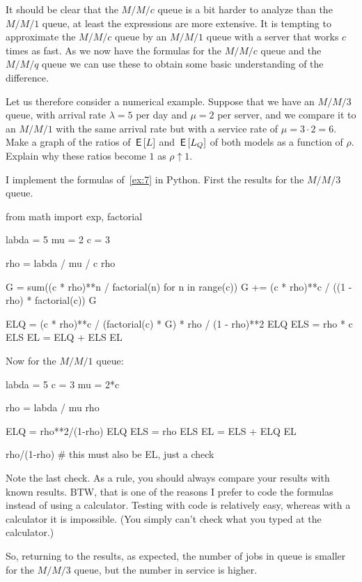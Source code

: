 \begin{exercise}\label{ex:27}
  It should be clear that the $M/M/c$ queue is a bit harder to analyze than the $M/M/1$ queue, at least the expressions are more extensive.
  It is tempting to approximate the $M/M/c$ queue by an $M/M/1$ queue with a server that works $c$ times as fast.
  As we now have the formulas for the $M/M/c$ queue and the $M/M/q$ queue we can use these to obtain some basic understanding of the difference.
  
  Let us therefore consider a numerical example.
  Suppose that we have an $M/M/3$ queue, with arrival rate $\lambda = 5$ per day and $\mu=2$ per server, and we compare it to an $M/M/1$ with the same arrival rate but with a service rate of $\mu = 3\cdot 2 = 6$.
  Make a graph of the ratios of $\,\mathsf{E}\left[L\right]$ and $\,\mathsf{E}\left[L_Q\right]$ of both models as a function of $\rho$.
  Explain why these ratios become $1$ as $\rho\uparrow 1$. 
\begin{solution}
I implement the formulas of~\cref{ex:7} in Python. First the results for the $M/M/3$ queue.

\begin{pyconsole}
from math import exp, factorial

labda = 5
mu = 2
c = 3

rho = labda / mu / c
rho

G = sum((c * rho)**n / factorial(n) for n in range(c))
G += (c * rho)**c / ((1 - rho) * factorial(c))
G

ELQ = (c * rho)**c / (factorial(c) * G) * rho / (1 - rho)**2
ELQ
ELS = rho * c
ELS
EL = ELQ + ELS
EL
\end{pyconsole}

Now for the $M/M/1$ queue:

\begin{pyconsole}
labda = 5
c = 3
mu = 2*c

rho = labda / mu 
rho

ELQ = rho**2/(1-rho)
ELQ
ELS = rho
ELS
EL = ELS + ELQ
EL

rho/(1-rho) # this must also be EL, just a check
\end{pyconsole}

Note the last check. As a rule, you should always compare your results
with known results. BTW, that is one of the reasons I prefer to code
the formulas instead of using a calculator. Testing with code is
relatively easy, whereas with a calculator it is impossible. (You
simply can't check what you typed at the calculator.)

So, returning to the results, as expected, the number of jobs in queue
is smaller for the $M/M/3$ queue, but the number in service is higher.


\end{solution}
\end{exercise}
